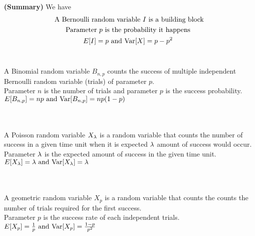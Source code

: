 \documentclass{report}
\begin{document}
\begin{theorem}
\label{1.1.25}
\textbf{(Summary)} We have
\begin{gather}
\text{ A Bernoulli random variable $I$ is a building block}\\
\text{ Parameter $p$ is the probability it happens }\\
E[I]=p \text{ and }\text{Var} [X]=p-p^2
\end{gather}\\

\begin{center}
    \begin{minipage}{0.9\linewidth}  
        \centering
         A Binomial random variable $B_{n,p}$ counts the success of multiple independent Bernoulli random variable (trials) of parameter $p$. \\
         Parameter $n$ is the number of trials and parameter $p$ is the success probability.\\
         $E[B_{n,p}]=np \text{ and }\text{Var} [B_{n,p}]=np(1-p)$
    \end{minipage}
\end{center}\\
\begin{gather}

\end{gather}
\begin{center}
    \begin{minipage}{0.9\linewidth}  
        \centering
        A Poisson random variable  $X_{\lambda }$ is a random variable that counts the number of success in a given time unit when it is expected $\lambda $ amount of success would occur.\\

        Parameter $\lambda $ is the expected amount of success in the given time unit.\\

        $E[X_\lambda ]=\lambda \text{ and }\text{Var} [X_\lambda ]=\lambda $
    \end{minipage}
\end{center}\\
\begin{gather}

\end{gather}
\begin{center}
    \begin{minipage}{0.9\linewidth}  
        \centering
        A geometric random variable $X_p$ is a random variable that counts the counts the number of trials required for the first success.\\
        
        Parameter  $p$ is the success rate of each independent trials.\\

        $E[X_p]=\frac{1}{p}\text{ and }\text{Var} [X_p]=\frac{1-p}{p^2}$
    \end{minipage}
\end{center}
\end{theorem}
\end{document}

